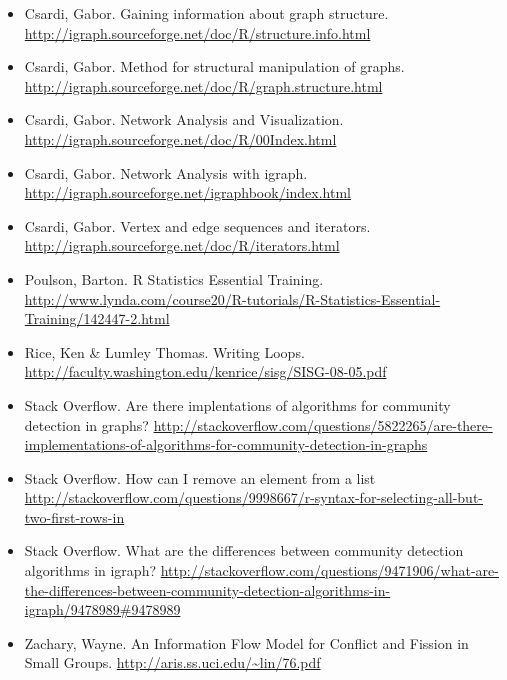 \documentclass{article}
\begin{document}
\begin{itemize}
\item Csardi, Gabor. Gaining information about graph structure. \url{http://igraph.sourceforge.net/doc/R/structure.info.html}
\item Csardi, Gabor. Method for structural manipulation of graphs. \url{http://igraph.sourceforge.net/doc/R/graph.structure.html}
\item Csardi, Gabor. Network Analysis and Visualization. \url{http://igraph.sourceforge.net/doc/R/00Index.html}
\item Csardi, Gabor. Network Analysis with igraph. \url{http://igraph.sourceforge.net/igraphbook/index.html}
\item Csardi, Gabor. Vertex and edge sequences and iterators. \url{http://igraph.sourceforge.net/doc/R/iterators.html}
\item Poulson, Barton. R Statistics Essential Training. \url{http://www.lynda.com/course20/R-tutorials/R-Statistics-Essential-Training/142447-2.html}
\item Rice, Ken \& Lumley Thomas. Writing Loops. \url{http://faculty.washington.edu/kenrice/sisg/SISG-08-05.pdf}
\item Stack Overflow. Are there implentations of algorithms for community detection in graphs? \url{http://stackoverflow.com/questions/5822265/are-there-implementations-of-algorithms-for-community-detection-in-graphs}
\item Stack Overflow. How can I remove an element from a list \url{http://stackoverflow.com/questions/9998667/r-syntax-for-selecting-all-but-two-first-rows-in}
\item Stack Overflow. What are the differences between community detection algorithms in igraph? \url{http://stackoverflow.com/questions/9471906/what-are-the-differences-between-community-detection-algorithms-in-igraph/9478989#9478989}
\item Zachary, Wayne. An Information Flow Model for Conflict and Fission in Small Groups. \url{http://aris.ss.uci.edu/~lin/76.pdf}


\end{itemize}
\end{document}
